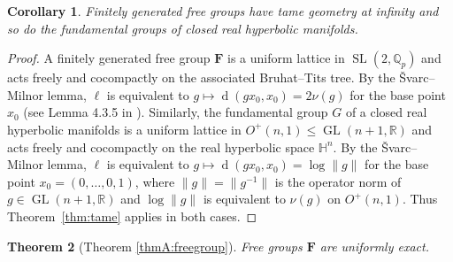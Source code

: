 \documentclass[12pt,nosumlimits,nonamelimits]{amsart}
\newtheorem{thm}{Theorem}
\newtheorem{cor}[thm]{Corollary}
\theoremstyle{remark}
\theoremstyle{definition}
\newcommand{\IH}{\mathbb{H}}
\newcommand{\IQ}{\mathbb{Q}}
\newcommand{\IR}{\mathbb{R}}
\newcommand{\bF}{\mathbf{F}}
\DeclareMathOperator{\GL}{GL}
\DeclareMathOperator{\SL}{SL}
\DeclareMathOperator{\dist}{d}
\begin{document}
\begin{cor}\label{cor:tame}
Finitely generated free groups have tame geometry at infinity 
and so do the fundamental groups 
of closed real hyperbolic manifolds.
\end{cor}
\begin{proof}
A finitely generated free group $\bF$ is a 
uniform lattice in $\SL(2,\IQ_p)$ and 
acts freely and cocompactly on the associated 
Bruhat--Tits tree.  
By the \v{S}varc--Milnor lemma, 
$\ell$ is equivalent to $g\mapsto\dist(gx_0,x_0) = 2\nu(g)$ 
for the base point $x_0$ (see Lemma 4.3.5 in \cite{chiswell}). 
Similarly, the fundamental group $G$ of a closed 
real hyperbolic manifolds is a uniform lattice in 
$O^+(n,1)\le \GL(n+1,\IR)$ and acts freely and 
cocompactly on the real hyperbolic space $\IH^n$. 
By the \v{S}varc--Milnor lemma, 
$\ell$ is equivalent to 
$g\mapsto\dist(gx_0,x_0)=\log\|g\|$ 
for the base point $x_0=(0,\ldots,0,1)$, 
where $\|g\| = \| g^{-1}\|$ is the operator norm 
of $g \in \GL(n+1,\IR)$ and $\log\|g\|$ is 
equivalent to $\nu(g)$ on $O^+(n,1)$. 
Thus Theorem~\ref{thm:tame} applies in both cases. 
\end{proof}
%
\begin{thm}[Theorem \ref{thmA:freegroup}]\label{thm:freegrp}
Free groups $\bF$ are uniformly exact. 
\end{thm}
\end{document}
